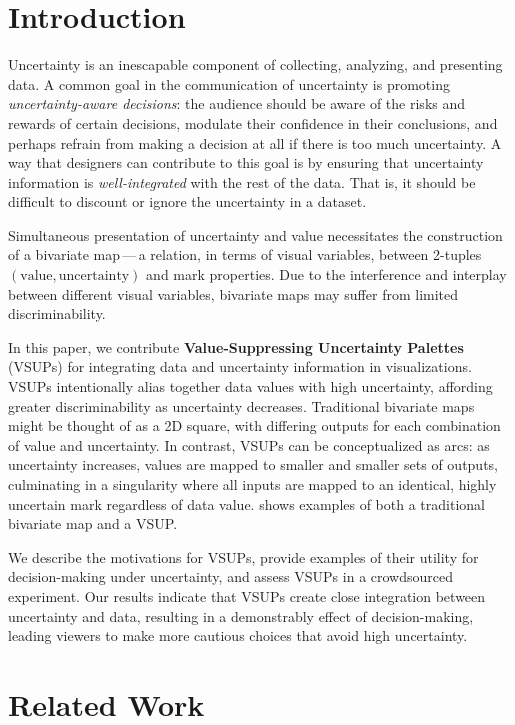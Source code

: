 \section{Introduction}
\exampleFig

Uncertainty is an inescapable component of collecting, analyzing, and presenting data. A common goal in the communication of uncertainty is promoting \emph{uncertainty-aware decisions}: the audience should be aware of the risks and rewards of certain decisions, modulate their confidence in their conclusions, and perhaps refrain from making a decision at all if there is too much uncertainty.  A way that designers can contribute to this goal is by ensuring that uncertainty information is \emph{well-integrated} with the rest of the data. That is, it should be difficult to discount or ignore the uncertainty in a dataset.

Simultaneous presentation of uncertainty and value necessitates the construction of a bivariate map\,---\,a relation, in terms of visual variables, between 2-tuples $(\text{value}, \text{uncertainty})$ and mark properties. Due to the interference and interplay between different visual variables, bivariate maps may suffer from limited discriminability.

In this paper, we contribute \textbf{Value-Suppressing Uncertainty Palettes} (VSUPs) for integrating data and uncertainty information in visualizations.
VSUPs intentionally alias together data values with high uncertainty, affording greater discriminability as uncertainty decreases. Traditional bivariate maps might be thought of as a 2D square, with differing outputs for each combination of value and uncertainty. In contrast, VSUPs can be conceptualized as arcs: as uncertainty increases, values are mapped to smaller and smaller sets of outputs, culminating in a singularity where all inputs are mapped to an identical, highly uncertain mark regardless of data value.  shows examples of both a traditional bivariate map and a VSUP.

We describe the motivations for VSUPs, provide examples of their utility for decision-making under uncertainty, and assess VSUPs in a crowdsourced experiment. Our results indicate that VSUPs create close integration between uncertainty and data, resulting in a demonstrably effect of decision-making, leading viewers to make more cautious choices that avoid high uncertainty.

\section{Related Work}

